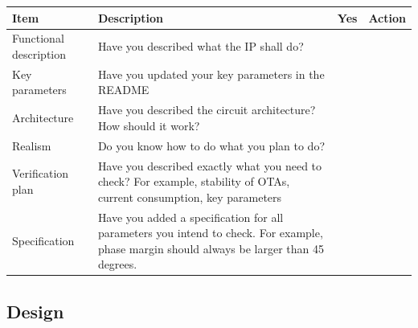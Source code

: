 \begin{longtable}[]{@{}
  >{\raggedright\arraybackslash}p{}
  >{\raggedright\arraybackslash}p{}
  >{\raggedright\arraybackslash}p{}
  >{\raggedright\arraybackslash}p{}@{}}
\toprule\noalign{}
\begin{minipage}[b]{\linewidth}\raggedright
Item
\end{minipage} & \begin{minipage}[b]{\linewidth}\raggedright
Description
\end{minipage} & \begin{minipage}[b]{\linewidth}\raggedright
Yes
\end{minipage} & \begin{minipage}[b]{\linewidth}\raggedright
Action
\end{minipage} \\
\midrule\noalign{}
\endhead
\bottomrule\noalign{}
\endlastfoot
Functional description & Have you described what the IP shall do? & & \\
Key parameters & Have you updated your key parameters in the README &
& \\
Architecture & Have you described the circuit architecture? How should
it work? & & \\
Realism & Do you know how to do what you plan to do? & & \\
Verification plan & Have you described exactly what you need to check?
For example, stability of OTAs, current consumption, key parameters &
& \\
Specification & Have you added a specification for all parameters you
intend to check. For example, phase margin should always be larger than
45 degrees. & & \\
\end{longtable}

\subsection{Design}\label{design}

